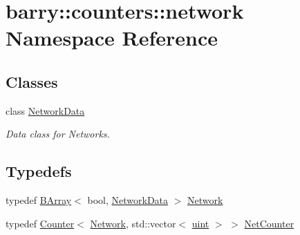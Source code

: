 \hypertarget{namespacebarry_1_1counters_1_1network}{}\section{barry\+:\+:counters\+:\+:network Namespace Reference}
\label{namespacebarry_1_1counters_1_1network}
\subsection*{Classes}
\begin{DoxyCompactItemize}
\item 
class \hyperlink{classbarry_1_1counters_1_1network_1_1_network_data}{Network\+Data}
\begin{DoxyCompactList}\small\item\em Data class for Networks. \end{DoxyCompactList}\end{DoxyCompactItemize}
\subsection*{Typedefs}
\begin{DoxyCompactItemize}
\item 
typedef \hyperlink{classbarry_1_1_b_array}{B\+Array}$<$ bool, \hyperlink{classbarry_1_1counters_1_1network_1_1_network_data}{Network\+Data} $>$ \hyperlink{namespacebarry_1_1counters_1_1network_a4cb88d4572ded3b447ea269c9cd0b2c0}{Network}
\item 
typedef \hyperlink{classbarry_1_1_counter}{Counter}$<$ \hyperlink{namespacebarry_1_1counters_1_1network_a4cb88d4572ded3b447ea269c9cd0b2c0}{Network}, std\+::vector$<$ \hyperlink{namespacebarry_a11dfc53ddb4672278319aa04f1e09a6c}{uint} $>$ $>$ \hyperlink{namespacebarry_1_1counters_1_1network_a2d14cbc0a77bfba218df85a750bfeb84}{Net\+Counter}
\end{DoxyCompactItemize}
